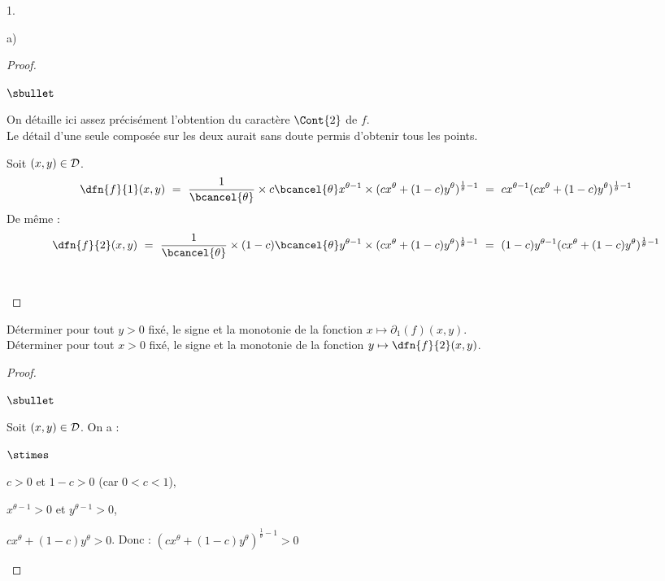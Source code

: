 \documentclass[11pt]{article}%
\begin{document}
\begin{noliste}{1.}
\begin{noliste}{a)}
\begin{proof}
\begin{noliste}{$\sbullet$}
    \begin{remark}
     On détaille ici assez précisément l'obtention du 
     caractère $\Cont{2}$ de $f$.\\
     Le détail d'une seule composée sur les deux 
     aurait sans doute permis d'obtenir tous les points.
    \end{remark}
    
    \item Soit $(x,y) \in {\cal D}$.
    \[
     \dfn{f}{1}(x,y) \ = \ \dfrac{1}{\bcancel{\theta}}
     \times c \bcancel{\theta} x^{\theta -1} \times 
     (c x^\theta + (1-c) y^\theta)^{\frac{1}{\theta} -1}
     \ = \ c x^{\theta-1} (c x^\theta + (1-c) 
     y^\theta)^{\frac{1}{\theta} -1}
    \]
    De même :
    \[
     \dfn{f}{2}(x,y) \ = \ \dfrac{1}{\bcancel{\theta}}
     \times (1-c) \bcancel{\theta} y^{\theta -1} \times 
     (c x^\theta + (1-c) y^\theta)^{\frac{1}{\theta} -1}
     \ = \ (1-c) y^{\theta-1} (c x^\theta + (1-c) 
     y^\theta)^{\frac{1}{\theta} -1}
    \]
    ~\\[-1.4cm]
   \end{noliste}
  \end{proof}
  
  
  
  
  \newpage
  
  

  
  \item Déterminer pour tout $y>0$ fixé, le signe et la monotonie de la 
  fonction $x \mapsto \partial_1(f)(x,y).$\\
  Déterminer pour tout $x>0$ fixé, le signe et la monotonie de 
  la fonction $y \mapsto \dfn{f}{2}(x,y)$.
  
  \begin{proof}~
   \begin{noliste}{$\sbullet$}
    \item Soit $(x,y) \in {\cal D}$. On a :
    \begin{noliste}{$\stimes$}
      \item $c>0$ et $1-c>0$ (car $0<c<1$),
      \item $x^{\theta-1}>0$ et $y^{\theta-1}>0$,
      \item $c x^\theta + (1-c) y^\theta >0$. Donc :
      $(c x^\theta + (1-c) y^\theta)^{\frac{1}{\theta}-1}>0$
    \end{noliste}
    

\end{noliste}
\end{proof}
\end{noliste}
\end{noliste}
\end{document}
